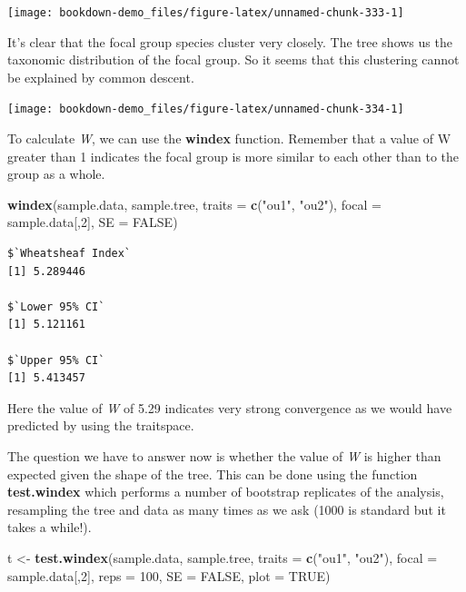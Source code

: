\documentclass[
]{book}
\newenvironment{Shaded}{\begin{snugshade}}{\end{snugshade}}
\newcommand{\DataTypeTok}[1]{\textcolor[rgb]{0.13,0.29,0.53}{#1}}
\newcommand{\DecValTok}[1]{\textcolor[rgb]{0.00,0.00,0.81}{#1}}
\newcommand{\KeywordTok}[1]{\textcolor[rgb]{0.13,0.29,0.53}{\textbf{#1}}}
\newcommand{\NormalTok}[1]{#1}
\newcommand{\OtherTok}[1]{\textcolor[rgb]{0.56,0.35,0.01}{#1}}
\newcommand{\StringTok}[1]{\textcolor[rgb]{0.31,0.60,0.02}{#1}}
\begin{document}
\begin{center}\texttt{[image: bookdown-demo\_files/figure-latex/unnamed-chunk-333-1]} \end{center}

It's clear that the focal group species cluster very closely. The tree shows us the taxonomic distribution of the focal group. So it seems that this clustering cannot be explained by common descent.

\begin{center}\texttt{[image: bookdown-demo\_files/figure-latex/unnamed-chunk-334-1]} \end{center}

To calculate \emph{W}, we can use the \textbf{windex} function. Remember that a value of W greater than 1 indicates the focal group is more similar to each other than to the group as a whole.

\begin{Shaded}
\begin{Highlighting}[]
\KeywordTok{windex}\NormalTok{(sample.data, sample.tree,}
       \DataTypeTok{traits =} \KeywordTok{c}\NormalTok{(}\StringTok{"ou1"}\NormalTok{, }\StringTok{"ou2"}\NormalTok{),}
       \DataTypeTok{focal =}\NormalTok{ sample.data[,}\DecValTok{2}\NormalTok{],}
       \DataTypeTok{SE =} \OtherTok{FALSE}\NormalTok{)}
\end{Highlighting}
\end{Shaded}

\begin{verbatim}
$`Wheatsheaf Index`
[1] 5.289446

$`Lower 95% CI`
[1] 5.121161

$`Upper 95% CI`
[1] 5.413457
\end{verbatim}

Here the value of \emph{W} of 5.29 indicates very strong convergence as we would have predicted by using the traitspace.

The question we have to answer now is whether the value of \emph{W} is higher than expected given the shape of the tree. This can be done using the function \textbf{test.windex} which performs a number of bootstrap replicates of the analysis, resampling the tree and data as many times as we ask (1000 is standard but it takes a while!).

\begin{Shaded}
\begin{Highlighting}[]
\NormalTok{t \textless{}{-}}\StringTok{ }\KeywordTok{test.windex}\NormalTok{(sample.data, sample.tree,}
       \DataTypeTok{traits =} \KeywordTok{c}\NormalTok{(}\StringTok{"ou1"}\NormalTok{, }\StringTok{"ou2"}\NormalTok{),}
       \DataTypeTok{focal =}\NormalTok{ sample.data[,}\DecValTok{2}\NormalTok{], }\DataTypeTok{reps =} \DecValTok{100}\NormalTok{,}
       \DataTypeTok{SE =} \OtherTok{FALSE}\NormalTok{, }\DataTypeTok{plot =} \OtherTok{TRUE}\NormalTok{)}
\end{Highlighting}
\end{Shaded}
\end{document}
